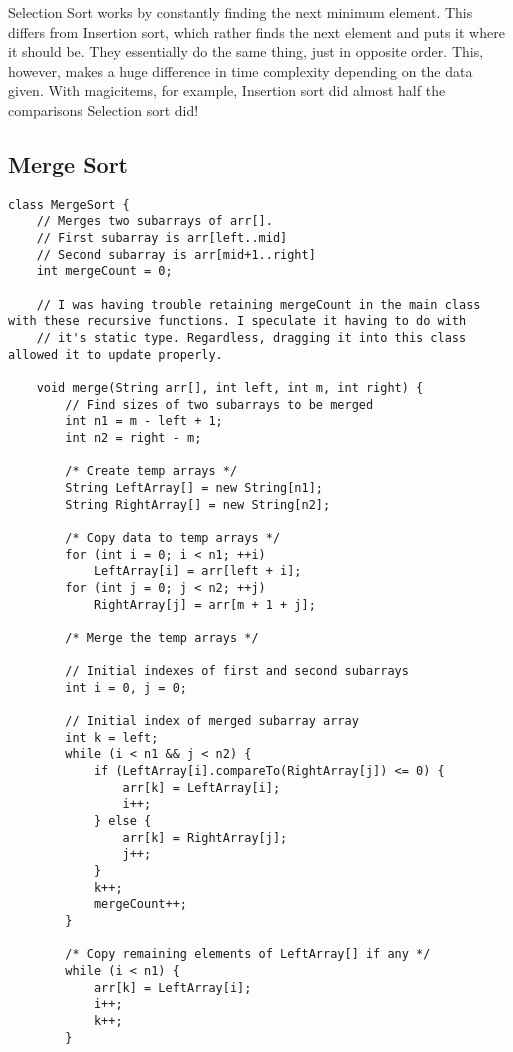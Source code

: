 \documentclass[letterpaper, 10pt,DIV=13]{scrartcl}
\numberwithin{equation}{section} %
\numberwithin{figure}{section} %
\numberwithin{table}{section} %
\begin{document}
Selection Sort works by constantly finding the next minimum element. This differs from Insertion sort, which rather finds the next element and puts it where it should be. They essentially do the same thing, just in opposite order. This, however, makes a huge difference in time complexity depending on the data given. With magicitems, for example, Insertion sort did almost half the comparisons Selection sort did!

\subsection{Merge Sort}
\begin{lstlisting}[frame=single, ] 
class MergeSort {
    // Merges two subarrays of arr[].
    // First subarray is arr[left..mid]
    // Second subarray is arr[mid+1..right]
    int mergeCount = 0;

    // I was having trouble retaining mergeCount in the main class with these recursive functions. I speculate it having to do with
    // it's static type. Regardless, dragging it into this class allowed it to update properly.
    
    void merge(String arr[], int left, int m, int right) {
        // Find sizes of two subarrays to be merged
        int n1 = m - left + 1;
        int n2 = right - m;

        /* Create temp arrays */
        String LeftArray[] = new String[n1];
        String RightArray[] = new String[n2];

        /* Copy data to temp arrays */
        for (int i = 0; i < n1; ++i)
            LeftArray[i] = arr[left + i];
        for (int j = 0; j < n2; ++j)
            RightArray[j] = arr[m + 1 + j];

        /* Merge the temp arrays */

        // Initial indexes of first and second subarrays
        int i = 0, j = 0;

        // Initial index of merged subarray array
        int k = left;
        while (i < n1 && j < n2) {
            if (LeftArray[i].compareTo(RightArray[j]) <= 0) {
                arr[k] = LeftArray[i];
                i++;
            } else {
                arr[k] = RightArray[j];
                j++;
            }
            k++;
            mergeCount++;
        }

        /* Copy remaining elements of LeftArray[] if any */
        while (i < n1) {
            arr[k] = LeftArray[i];
            i++;
            k++;
        }


\end{lstlisting}
\end{document}
